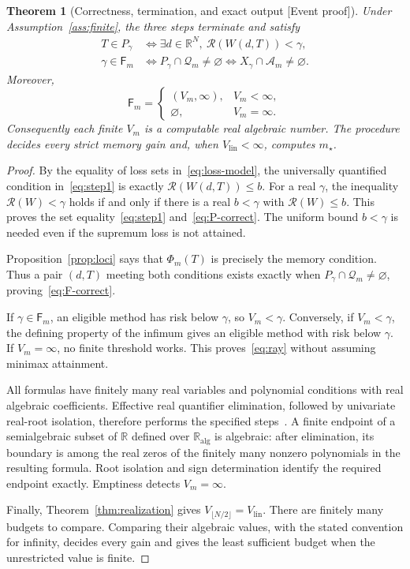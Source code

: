 \documentclass[11pt]{article}
\newcommand{\supportlabel}[1]{\textcolor{blue!60!black}{\small\textsf{[#1]}}}
\newcommand{\eventproof}{\supportlabel{Event proof}}
\numberwithin{equation}{section}
\newtheorem{theorem}{Theorem}[section]
\theoremstyle{definition}
\newcommand{\R}{\mathbb R}
\newcommand{\K}{\mathbb R_{\mathrm{alg}}}
\newcommand{\A}{\mathcal A}
\newcommand{\Q}{\mathcal Q}
\newcommand{\risk}{\mathcal R}
\begin{document}
\begin{theorem}[Correctness, termination, and exact output \eventproof]\label{thm:procedure}
Under Assumption~\ref{ass:finite}, the three steps terminate and satisfy
\begin{align}
 T\in P_\gamma&\Longleftrightarrow
 \exists d\in\R^N,\ \risk(W(d,T))<\gamma,\label{eq:P-correct}\\
 \gamma\in \mathsf F_m&\Longleftrightarrow
 P_\gamma\cap\Q_m\ne\varnothing
 \Longleftrightarrow X_\gamma\cap\A_m\ne\varnothing.\label{eq:F-correct}
\end{align}
Moreover,
\begin{equation}
 \mathsf F_m=
 \begin{cases}
 (V_m,\infty),&V_m<\infty,\\
 \varnothing,&V_m=\infty.
 \end{cases}
 \label{eq:ray}
\end{equation}
Consequently each finite $V_m$ is a computable real algebraic number. The procedure decides every strict memory gain and, when $V_{\mathrm{lin}}<\infty$, computes $m_\star$.
\end{theorem}
\begin{proof}
By the equality of loss sets in~\eqref{eq:loss-model}, the universally quantified condition in~\eqref{eq:step1} is exactly $\risk(W(d,T))\le b$. For a real $\gamma$, the inequality $\risk(W)<\gamma$ holds if and only if there is a real $b<\gamma$ with $\risk(W)\le b$. This proves the set equality~\eqref{eq:step1} and~\eqref{eq:P-correct}. The uniform bound $b<\gamma$ is needed even if the supremum loss is not attained.

Proposition~\ref{prop:loci} says that $\Phi_m(T)$ is precisely the memory condition. Thus a pair $(d,T)$ meeting both conditions exists exactly when $P_\gamma\cap\Q_m\ne\varnothing$, proving~\eqref{eq:F-correct}.

If $\gamma\in \mathsf F_m$, an eligible method has risk below $\gamma$, so $V_m<\gamma$. Conversely, if $V_m<\gamma$, the defining property of the infimum gives an eligible method with risk below $\gamma$. If $V_m=\infty$, no finite threshold works. This proves~\eqref{eq:ray} without assuming minimax attainment.

All formulas have finitely many real variables and polynomial conditions with real algebraic coefficients. Effective real quantifier elimination, followed by univariate real-root isolation, therefore performs the specified steps~\cite{BPR}. A finite endpoint of a semialgebraic subset of $\R$ defined over $\K$ is algebraic: after elimination, its boundary is among the real zeros of the finitely many nonzero polynomials in the resulting formula. Root isolation and sign determination identify the required endpoint exactly. Emptiness detects $V_m=\infty$.

Finally, Theorem~\ref{thm:realization} gives $V_{\lfloor N/2\rfloor}=V_{\mathrm{lin}}$. There are finitely many budgets to compare. Comparing their algebraic values, with the stated convention for infinity, decides every gain and gives the least sufficient budget when the unrestricted value is finite.
\end{proof}
\end{document}
